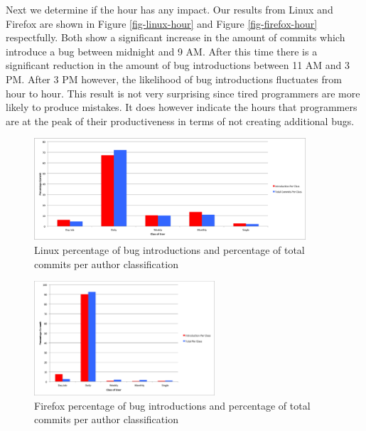 \documentclass[preprint, 11pt]{sigplanconf}
\begin{document}
Next we determine if the hour has any impact. Our results from Linux
and Firefox are shown in Figure \ref{fig-linux-hour} and Figure
\ref{fig-firefox-hour} respectfully. Both show a significant increase
in the amount of commits which introduce a bug between midnight and 9
AM. After this time there is a significant reduction in the amount of
bug introductions between 11 AM and 3 PM. After 3 PM however, the
likelihood of bug introductions fluctuates from hour to hour. This
result is not very surprising since tired programmers are more likely to
produce mistakes. It does however indicate the hours that programmers
are at the peak of their productiveness in terms of not creating
additional bugs.

\begin{figure}
\begin{center}
\includegraphics[width=0.9\textwidth]{linux_per_class.png}
\end{center}
\caption{Linux percentage of bug introductions and percentage of total commits per author classification}
\label{fig-linux-class}
\end{figure}

\begin{figure}
\begin{center}
\includegraphics[width=0.6\textwidth]{firefox_per_class.png}
\end{center}
\caption{Firefox percentage of bug introductions and percentage of total commits per author classification}
\label{fig-firefox-class}
\end{figure}
\end{document}

